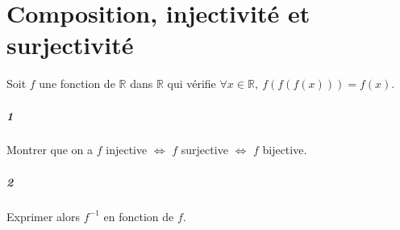 \documentclass[10pt,a4paper]{article}
\begin{document}
\section{Composition, injectivité et surjectivité}
Soit $f$ une fonction de $\mathbb{R}$ dans $\mathbb{R}$ qui vérifie $\forall x \in \mathbb{R}, \ f(f(f(x)))=f(x)$.
\subparagraph{1} Montrer que on a $f$ injective $\Leftrightarrow$ $f$ surjective $\Leftrightarrow$ $f$ bijective.
\subparagraph{2} Exprimer alors $f^{-1}$ en fonction de $f$.
\end{document}
